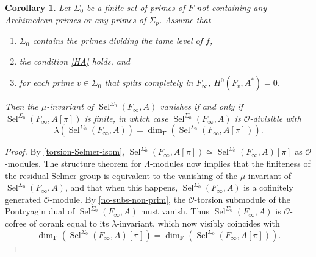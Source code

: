 \documentclass[12 pt]{amsart}
\theoremstyle{plain}
\newtheorem{cor}[thm]{Corollary}
\theoremstyle{definition}
\numberwithin{equation}{section}
\numberwithin{table}{section}
\begin{document}
\begin{cor}
\label{divisible-Selmer}
Let $\Sigma_0$ be a finite set of primes of $F$ not containing any Archimedean primes or any primes of $\Sigma_p$. Assume that
\begin{enumerate}
\item $\Sigma_0$ contains the primes dividing the tame level of $f$,
\item the condition \emph{\cref{HA}} holds, and
\item for each prime $v\in\Sigma_0$ that splits completely in $F_\infty$, $H^0(F_v,A^*)=0$.
\end{enumerate}
Then the $\mu$-invariant of $\operatorname{Sel}^{\Sigma_0}(F_\infty,A)$ vanishes if and only if $\operatorname{Sel}^{\Sigma_0}(F_\infty,A[\pi])$ is finite, in which case $\operatorname{Sel}^{\Sigma_0}(F_\infty,A)$ is $\mathscr{O}$-divisible with
\begin{equation*}
\lambda(\operatorname{Sel}^{\Sigma_0}(F_\infty,A))=\dim_{\mathbf{F}}(\operatorname{Sel}^{\Sigma_0}(F_\infty,A[\pi]))\text{.}
\end{equation*}
\end{cor}
\begin{proof}
By \cref{torsion-Selmer-isom}, $\operatorname{Sel}^{\Sigma_0}(F_\infty,A[\pi])\simeq\operatorname{Sel}^{\Sigma_0}(F_\infty,A)[\pi]$ as $\mathscr{O}$-modules. The structure theorem for $\Lambda$-modules now implies that the finiteness of the residual Selmer group is equivalent to the vanishing of the $\mu$-invariant of $\operatorname{Sel}^{\Sigma_0}(F_\infty,A)$, and that when this happens, $\operatorname{Sel}^{\Sigma_0}(F_\infty,A)$ is a cofinitely generated $\mathscr{O}$-module. By \cref{no-subs-non-prim}, the $\mathscr{O}$-torsion submodule of the Pontryagin dual of $\operatorname{Sel}^{\Sigma_0}(F_\infty,A)$ must vanish. Thus $\operatorname{Sel}^{\Sigma_0}(F_\infty,A)$ is $\mathscr{O}$-cofree of corank equal to its $\lambda$-invariant, which now visibly coincides with
\begin{equation*}
\dim_\mathbf{F}(\operatorname{Sel}^{\Sigma_0}(F_\infty,A)[\pi])=\dim_\mathbf{F}(\operatorname{Sel}^{\Sigma_0}(F_\infty,A[\pi]))\text{.}
\end{equation*}
\end{proof}
\end{document}
